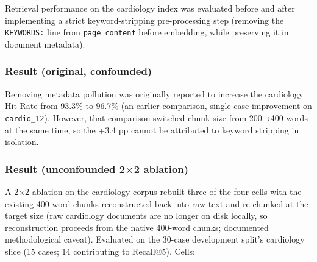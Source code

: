 \documentclass[
  american,
  a4paper,
]{article}
\begin{document}
Retrieval performance on the cardiology index was evaluated before and
after implementing a strict keyword-stripping pre-processing step
(removing the \texttt{KEYWORDS:} line from \texttt{page\_content} before
embedding, while preserving it in document metadata).

\subsubsection{Result (original,
confounded)}\label{result-original-confounded}

Removing metadata pollution was originally reported to increase the
cardiology Hit Rate from 93.3\% to 96.7\% (an earlier comparison,
single-case improvement on \texttt{cardio\_12}). However, that
comparison switched chunk size from 200→400 words at the same time, so
the +3.4 pp cannot be attributed to keyword stripping in isolation.

\subsubsection{Result (unconfounded 2×2
ablation)}\label{result-unconfounded-22-ablation}

A 2×2 ablation on the cardiology corpus rebuilt three of the four cells
with the existing 400-word chunks reconstructed back into raw text and
re-chunked at the target size (raw cardiology documents are no longer on
disk locally, so reconstruction proceeds from the native 400-word
chunks; documented methodological caveat). Evaluated on the 30-case
development split's cardiology slice (15 cases; 14 contributing to
Recall@5). Cells:
\end{document}
